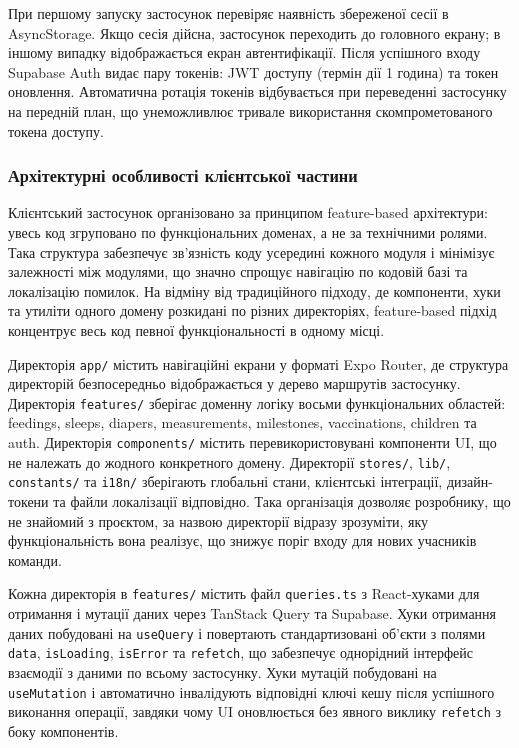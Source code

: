 При першому запуску застосунок перевіряє наявність збереженої сесії в AsyncStorage. Якщо сесія дійсна, застосунок переходить до головного екрану; в іншому випадку відображається екран автентифікації. Після успішного входу Supabase Auth видає пару токенів: \gls{JWT} доступу (термін дії 1 година) та токен оновлення. Автоматична ротація токенів відбувається при переведенні застосунку на передній план, що унеможливлює тривале використання скомпрометованого токена доступу.

\subsubsection{Архітектурні особливості клієнтської частини}

Клієнтський застосунок організовано за принципом feature-based архітектури: увесь код згруповано по функціональних доменах, а не за технічними ролями. Така структура забезпечує зв'язність коду усередині кожного модуля і мінімізує залежності між модулями, що значно спрощує навігацію по кодовій базі та локалізацію помилок. На відміну від традиційного підходу, де компоненти, хуки та утиліти одного домену розкидані по різних директоріях, feature-based підхід концентрує весь код певної функціональності в одному місці.

Директорія \texttt{app/} містить навігаційні екрани у форматі Expo Router, де структура директорій безпосередньо відображається у дерево маршрутів застосунку. Директорія \texttt{features/} зберігає доменну логіку восьми функціональних областей: feedings, sleeps, diapers, measurements, milestones, vaccinations, children та auth. Директорія \texttt{components/} містить перевикористовувані компоненти \gls{UI}, що не належать до жодного конкретного домену. Директорії \texttt{stores/}, \texttt{lib/}, \texttt{constants/} та \texttt{i18n/} зберігають глобальні стани, клієнтські інтеграції, дизайн-токени та файли локалізації відповідно. Така організація дозволяє розробнику, що не знайомий з проєктом, за назвою директорії відразу зрозуміти, яку функціональність вона реалізує, що знижує поріг входу для нових учасників команди.

Кожна директорія в \texttt{features/} містить файл \texttt{queries.ts} з React-хуками для отримання і мутації даних через TanStack Query та Supabase. Хуки отримання даних побудовані на \texttt{useQuery} і повертають стандартизовані об'єкти з полями \texttt{data}, \texttt{isLoading}, \texttt{isError} та \texttt{refetch}, що забезпечує однорідний інтерфейс взаємодії з даними по всьому застосунку. Хуки мутацій побудовані на \texttt{useMutation} і автоматично інвалідують відповідні ключі кешу після успішного виконання операції, завдяки чому \gls{UI} оновлюється без явного виклику \texttt{refetch} з боку компонентів.

